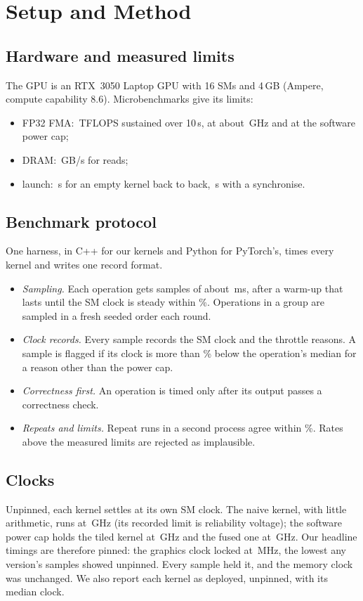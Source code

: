\documentclass[conference]{IEEEtran}
\begin{document}
\section{Setup and Method}
\subsection{Hardware and measured limits}
The GPU is an RTX~3050 Laptop GPU with 16 SMs and 4\,GB (Ampere, compute capability 8.6). Microbenchmarks
give its limits:
\begin{itemize}
\item FP32 FMA: \PeakTflops\,TFLOPS sustained over 10\,s, at about \PeakGhz\,GHz and at the software power cap;
\item DRAM: \DramGBs\,GB/s for reads;
\item launch: \LaunchUs\,\textmu s for an empty kernel back to back, \LaunchSyncUs\,\textmu s with a synchronise.
\end{itemize}

\subsection{Benchmark protocol}
One harness, in C++ for our kernels and Python for PyTorch's, times every kernel and writes one record format.
\begin{itemize}
\item \textit{Sampling.} Each operation gets \ProtoSamples{} samples of about \ProtoSampleMs\,ms, after a warm-up
that lasts until the SM clock is steady within \ProtoClockTolPct\%. Operations in a group are sampled in a fresh
seeded order each round.
\item \textit{Clock records.} Every sample records the SM clock and the throttle reasons. A sample is flagged if
its clock is more than \ProtoThrottlePct\% below the operation's median for a reason other than the power cap.
\item \textit{Correctness first.} An operation is timed only after its output passes a correctness check.
\item \textit{Repeats and limits.} Repeat runs in a second process agree within \RepeatMaxPct\%. Rates above the measured
limits are rejected as implausible.
\end{itemize}

\subsection{Clocks}
Unpinned, each kernel settles at its own SM clock. The naive kernel, with little arithmetic, runs at
\DepVoneGhz\,GHz (its recorded limit is reliability voltage); the software power cap holds the tiled kernel at
\DepVtwoGhz\,GHz and the fused one at \DepVthreeGhz\,GHz. Our headline timings are therefore pinned: the graphics
clock locked at \PinMhz\,MHz, the lowest any version's samples showed unpinned. Every sample held it, and the
memory clock was unchanged. We also report each kernel as deployed, unpinned, with its median clock.
\end{document}
